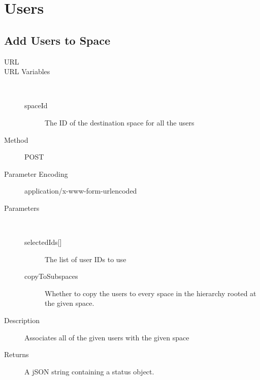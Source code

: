 \chapter{Users}

\section{Add Users to Space}
\begin{description}
\item [URL] 
\item [URL Variables] \
	\begin{description}
	\item [spaceId]  The ID of the destination space for all the users
	\end{description}
\item [Method] POST
\item [Parameter Encoding] application/x-www-form-urlencoded
\item [Parameters] \
	\begin{description}
	\item [{selectedIds[]}]  The list of user IDs to use
	\item [copyToSubspaces]  Whether to copy the users to every space in the hierarchy rooted at the given space.
	\end{description}
\item [Description] Associates all of the given users with the given space
\item [Returns] A jSON string containing a status object.
\end{description}


